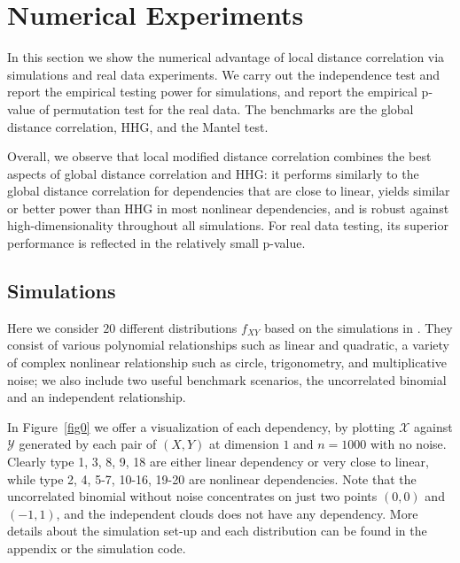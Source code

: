 \documentclass[12pt]{article}
\begin{document}
\section{Numerical Experiments}
\label{numer}
In this section we show the numerical advantage of local distance correlation via simulations and real data experiments. We carry out the independence test and report the empirical testing power for simulations, and report the empirical p-value of permutation test for the real data. The benchmarks are the global distance correlation, HHG, and the Mantel test. 

Overall, we observe that local modified distance correlation combines the best aspects of global distance correlation and HHG: it performs similarly to the global distance correlation for dependencies that are close to linear, yields similar or better power than HHG in most nonlinear dependencies, and is robust against high-dimensionality throughout all simulations. For real data testing, its superior performance is reflected in the relatively small p-value.

\subsection{Simulations}
\label{numer1}
Here we consider $20$ different distributions $f_{XY}$ based on the simulations in \cite{SzekelyRizzoBakirov2007, SimonTibshirani2012, GorfineHellerHeller2012, HellerGorfine2013}. They consist of various polynomial relationships such as linear and quadratic, a variety of complex nonlinear relationship such as circle, trigonometry, and multiplicative noise; we also include two useful benchmark scenarios, the uncorrelated binomial and an independent relationship. 

In Figure~\ref{fig0} we offer a visualization of each dependency, by plotting $\mathcal{X}$ against $\mathcal{Y}$ generated by each pair of $(X,Y)$ at dimension $1$ and $n=1000$ with no noise. Clearly type 1, 3, 8, 9, 18 are either linear dependency or very close to linear, while type 2, 4, 5-7, 10-16, 19-20 are nonlinear dependencies. Note that the uncorrelated binomial without noise concentrates on just two points $(0,0)$ and $(-1,1)$, and the independent clouds does not have any dependency. More details about the simulation set-up and each distribution can be found in the appendix or the simulation code.
\end{document}
